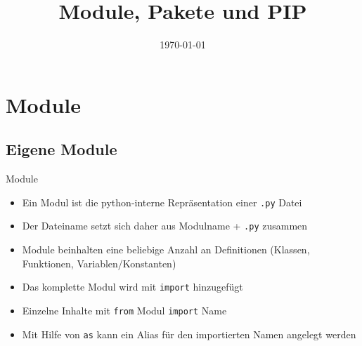 

\usepackage{comment}

\newcommand{\topic}{
	Module, Pakete und PIP
}

\title{\topic}
\supertitle{\course}
\date{\today}



\maketitle

\begin{frame}
	\tableofcontents
\end{frame}



\section{Module}
\subsection{Eigene Module}
\begin{frame}[fragile]{Module}
	\begin{itemize}
		\item Ein Modul ist die python-interne Repr\"asentation einer \texttt{.py} Datei
		\item Der Dateiname setzt sich daher aus Modulname + \texttt{.py} zusammen
		\item Module beinhalten eine beliebige Anzahl an Definitionen (Klassen, Funktionen, Variablen/Konstanten)
		\item Das komplette Modul wird mit \texttt{import} hinzugef\"ugt
		\item Einzelne Inhalte mit \texttt{from} Modul \texttt{import} Name
		\item Mit Hilfe von \texttt{as} kann ein Alias f\"ur den importierten Namen angelegt werden
	\end{itemize}
\end{frame}

